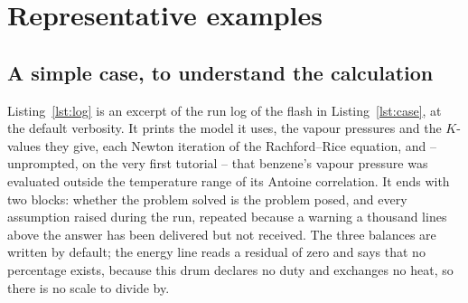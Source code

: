 \documentclass[11pt,a4paper]{article}
\begin{document}
\section{Representative examples}
\label{sec:examples}

\subsection{A simple case, to understand the calculation}
\label{sec:ex-simple}

Listing~\ref{lst:log} is an excerpt of the run log of the flash in
Listing~\ref{lst:case}, at the default verbosity.  It prints the model it
uses, the vapour pressures and the $K$-values they give, each Newton
iteration of the Rachford--Rice equation, and -- unprompted, on the very
first tutorial -- that benzene's vapour pressure was evaluated outside the
temperature range of its Antoine correlation.  It ends with two blocks:
whether the problem solved is the problem posed, and every assumption
raised during the run, repeated because a warning a thousand lines above
the answer has been delivered but not received.  The three balances are
written by default; the energy line reads a residual of zero and says that
no percentage exists, because this drum declares no duty and exchanges no
heat, so there is no scale to divide by.
\end{document}

